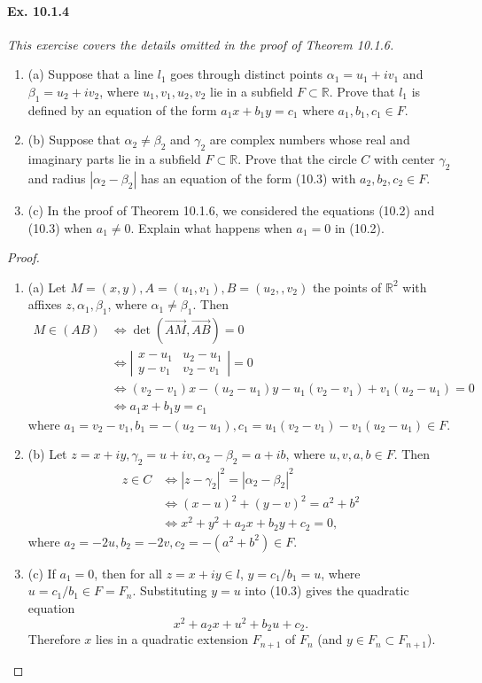 \documentclass[11pt,a4paper]{article}
\newcommand{\be} {\begin{enumerate}}
\newcommand{\ee} {\end{enumerate}}
\newcommand{\R}{\mathbb{R}}
\begin{document}
\paragraph{Ex. 10.1.4}

{\it This exercise covers the details omitted in the proof of Theorem 10.1.6.
\be
\item[(a)] Suppose that a line $l_1$ goes through distinct points $\alpha_1 = u_1+iv_1$ and $\beta_1 = u_2+iv_2$, where $u_1,v_1,u_2,v_2$ lie in a subfield $F \subset \R$. Prove that $l_1$ is defined by an equation of the form $a_1x +b_1y = c_1$ where $a_1,b_1,c_1 \in F$.
\item[(b)] Suppose that $\alpha_2 \ne \beta_2$ and $\gamma_2$ are complex numbers whose real and imaginary parts lie in a subfield $F\subset \R$. Prove that the circle $C$ with center $\gamma_2$ and radius $|\alpha_2-\beta_2|$ has an equation of the form (10.3) with $a_2,b_2,c_2 \in F$.
\item[(c)] In the proof of Theorem 10.1.6, we considered the equations (10.2) and (10.3) when $a_1\ne 0$. Explain what happens when $a_1 = 0$ in (10.2).
\ee
}

\begin{proof}
\be
\item[(a)]
 Let $M = (x,y),A = (u_1,v_1),B = (u_2,,v_2)$ the points of $\R^2$ with affixes $z,\alpha_1,\beta_1$, where $\alpha_1\ne \beta_1$.
Then 
\begin{align*}
M \in (AB) &\iff \det(\overrightarrow{AM}, \overrightarrow{AB}) = 0\\
&\iff
\left|
\begin{array}{ccc}
  x-u_1& u_2-u_1    \\
  y-v_1& v_2-v_1      
\end{array}
\right|
=0\\
&\iff (v_2-v_1)x - (u_2-u_1)y -u_1(v_2-v_1) +v_1 (u_2-u_1) = 0\\
&\iff a_1x+b_1y = c_1
\end{align*}
where $a_1 = v_2-v_1, b_1 = -(u_2-u_1), c_1 = u_1(v_2-v_1) - v_1(u_2-u_1) \in F$.
\item[(b)] Let $z = x+iy, \gamma_2 = u+iv, \alpha_2 - \beta_2 = a +ib$, where $u,v,a,b \in F$. Then
\begin{align*}
z \in C &\iff |z-\gamma_2|^2 = |\alpha_2-\beta_2|^2\\
&\iff(x-u)^2 + (y-v)^2 = a^2+b^2\\
&\iff x^2+y^2+a_2x+b_2y+c_2 = 0,
\end{align*}
where $a_2 = -2u,b_2 = -2v ,c_2 = -(a^2+b^2) \in F$.
\item[(c)] If $a_1 = 0$, then for all $z =x+iy \in l$, $y=c_1/b_1 = u$, where $u = c_1/b_1 \in F=F_n$. Substituting $y = u$ into (10.3) gives the quadratic equation
$$x^2+a_2x+u^2+b_2u+c_2.$$
Therefore $x$ lies in a quadratic extension $F_{n+1}$ of $F_n$ (and $y \in F_n \subset F_{n+1}$).
\ee
\end{proof}
\end{document}
